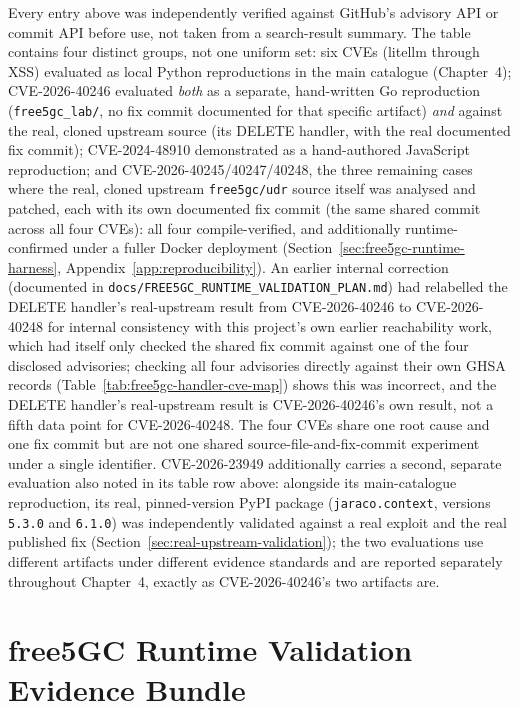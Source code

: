 \documentclass[12pt,a4paper]{report}
\begin{document}
Every entry above was independently verified against GitHub's advisory API or commit API before use, not taken from a search-result summary. The table contains four distinct groups, not one uniform set: six CVEs (litellm through XSS) evaluated as local Python reproductions in the main catalogue (Chapter~4); CVE-2026-40246 evaluated \emph{both} as a separate, hand-written Go reproduction (\texttt{free5gc\_lab/}, no fix commit documented for that specific artifact) \emph{and} against the real, cloned upstream source (its DELETE handler, with the real documented fix commit); CVE-2024-48910 demonstrated as a hand-authored JavaScript reproduction; and CVE-2026-40245/40247/40248, the three remaining cases where the real, cloned upstream \texttt{free5gc/udr} source itself was analysed and patched, each with its own documented fix commit (the same shared commit across all four CVEs): all four compile-verified, and additionally runtime-confirmed under a fuller Docker deployment (Section~\ref{sec:free5gc-runtime-harness}, Appendix~\ref{app:reproducibility}). An earlier internal correction (documented in \texttt{docs/FREE5GC\_RUNTIME\_VALIDATION\_PLAN.md}) had relabelled the DELETE handler's real-upstream result from CVE-2026-40246 to CVE-2026-40248 for internal consistency with this project's own earlier reachability work, which had itself only checked the shared fix commit against one of the four disclosed advisories; checking all four advisories directly against their own GHSA records (Table~\ref{tab:free5gc-handler-cve-map}) shows this was incorrect, and the DELETE handler's real-upstream result is CVE-2026-40246's own result, not a fifth data point for CVE-2026-40248. The four CVEs share one root cause and one fix commit but are not one shared source-file-and-fix-commit experiment under a single identifier. CVE-2026-23949 additionally carries a second, separate evaluation also noted in its table row above: alongside its main-catalogue reproduction, its real, pinned-version PyPI package (\texttt{jaraco.context}, versions \texttt{5.3.0} and \texttt{6.1.0}) was independently validated against a real exploit and the real published fix (Section~\ref{sec:real-upstream-validation}); the two evaluations use different artifacts under different evidence standards and are reported separately throughout Chapter~4, exactly as CVE-2026-40246's two artifacts are.

\section{free5GC Runtime Validation Evidence Bundle}
\label{sec:free5gc-evidence-bundle}
\end{document}
